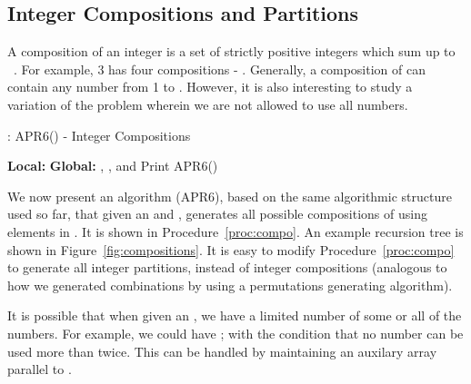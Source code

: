\documentclass{article}
\begin{document}
\subsection{Integer Compositions and Partitions}

A composition of an integer  is a set of strictly positive integers which sum up to ~\cite{compositions}. For example, 3 has four compositions - . Generally, a composition of  can contain any number from 1 to . However, it is also interesting to study a variation of the problem wherein we are not allowed to use all numbers.

\begin{algorithm}
\begin{algorithmic}[1]
\caption{: APR6() - Integer Compositions}
\label{proc:compo}
\STATE \textbf{Local:} 
\STATE \textbf{Global:} , ,  and 
\medskip
\IF{}
	\STATE Print 
	\RETURN
\ELSE
		\IF{}
			\STATE  
			\STATE 
			\STATE APR6()
			\STATE 
		\ENDIF
	\ENDFOR
\ENDIF
\end{algorithmic}
\end{algorithm}

We now present an algorithm (APR6), based on the same algorithmic structure used so far, that given an  and , generates all possible compositions of  using elements in . It is shown in Procedure~\ref{proc:compo}. An example recursion tree is shown in Figure~\ref{fig:compositions}. It is easy to modify Procedure~\ref{proc:compo} to generate all integer partitions, instead of integer compositions (analogous to how we generated combinations by using a permutations generating algorithm).

It is possible that when given an , we have a limited number of some or all of the numbers. For example, we could have ;  with the condition that no number can be used more than twice. This can be handled by maintaining an auxilary array  parallel to .
\end{document}

